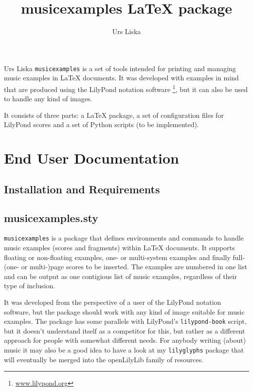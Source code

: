 \documentclass{OLLbook}
\title{musicexamples \LaTeX{} package}
\author{Urs Liska}
\begin{document}
\maketitle
\begin{authorAbstract}{Urs Liska}
\texttt{musicexamples} is a set of tools intended for printing and managing music examples in \LaTeX{} documents.
It was developed with examples in mind that are produced using the LilyPond notation software%
\footnote{\url{www.lilypond.org}},
but it can also be used to handle any kind of images.

It consists of three parts: a \LaTeX{} package, a set of configuration files for LilyPond scores and a set of Python scripts (to be implemented).
\end{authorAbstract}

\vfill


\tableofcontents

\chapter{End User Documentation}
\section{Installation and Requirements}

\section{musicexamples.sty}

\texttt{musicexamples} is a package that defines environments and commands to handle music examples (scores and fragments) within \LaTeX{} documents.
It supports floating or non-floating examples, one- or multi-system examples and finally full-(one- or multi-)page scores to be inserted.
The examples are numbered in one list and can be output as one contigious list of music examples, regardless of their type of inclusion.

It was developed from the perspective of a user of the LilyPond notation software, but the package should work with any kind of image suitable for music examples.
The package has some parallels with LilyPond's \texttt{lilypond-book} script, but it doesn't understand itself as a competitor for this, but rather as a different approach for people with somewhat different needs.
For anybody writing (about) music it may also be a good idea to have a look at my \texttt{lilyglyphs} package that will eventually be merged into the openLilyLib family of resources.
\end{document}
